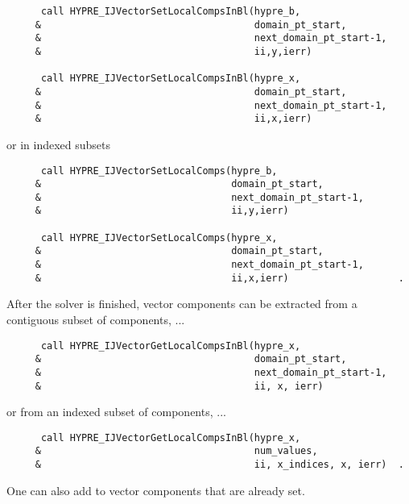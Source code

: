 \begin{verbatim}
      call HYPRE_IJVectorSetLocalCompsInBl(hypre_b,
     &                                     domain_pt_start,
     &                                     next_domain_pt_start-1,
     &                                     ii,y,ierr)

      call HYPRE_IJVectorSetLocalCompsInBl(hypre_x,
     &                                     domain_pt_start,
     &                                     next_domain_pt_start-1,
     &                                     ii,x,ierr)
\end{verbatim}

or in indexed subsets

\begin{verbatim}
      call HYPRE_IJVectorSetLocalComps(hypre_b,
     &                                 domain_pt_start,
     &                                 next_domain_pt_start-1,
     &                                 ii,y,ierr)

      call HYPRE_IJVectorSetLocalComps(hypre_x,
     &                                 domain_pt_start,
     &                                 next_domain_pt_start-1,
     &                                 ii,x,ierr)                   .
\end{verbatim}

After the solver is finished, vector components can be extracted from
a contiguous subset of components, ...

\begin{verbatim}
      call HYPRE_IJVectorGetLocalCompsInBl(hypre_x,
     &                                     domain_pt_start,
     &                                     next_domain_pt_start-1,
     &                                     ii, x, ierr)
\end{verbatim}

or from an indexed subset of components, ...

\begin{verbatim}
      call HYPRE_IJVectorGetLocalCompsInBl(hypre_x,
     &                                     num_values,
     &                                     ii, x_indices, x, ierr)  .
\end{verbatim}

One can also add to vector components that are already set.

